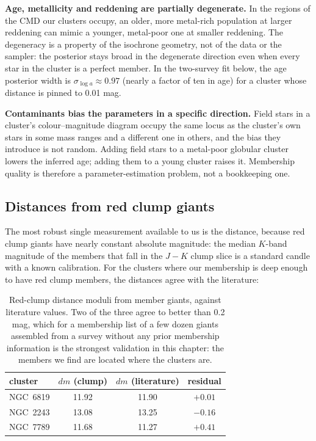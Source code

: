 \textbf{Age, metallicity and reddening are partially degenerate.} In the
regions of the CMD our clusters occupy, an older, more metal-rich population at
larger reddening can mimic a younger, metal-poor one at smaller reddening. The
degeneracy is a property of the isochrone geometry, not of the data or the
sampler: the posterior stays broad in the degenerate direction even when every
star in the cluster is a perfect member. In the two-survey fit below, the age
posterior width is $\sigma_{\log a} \approx 0.97$ (nearly a factor of ten in
age) for a cluster whose distance is pinned to 0.01 mag.

\textbf{Contaminants bias the parameters in a specific direction.} Field stars
in a cluster's colour--magnitude diagram occupy the same locus as the cluster's
own stars in some mass ranges and a different one in others, and the bias they
introduce is not random. Adding field stars to a metal-poor globular cluster
lowers the inferred age; adding them to a young cluster raises it. Membership
quality is therefore a parameter-estimation problem, not a bookkeeping one.

\subsection{Distances from red clump giants}

The most robust single measurement available to us is the distance, because
red clump giants have nearly constant absolute magnitude: the median $K$-band
magnitude of the members that fall in the $J-K$ clump slice is a standard
candle with a known calibration. For the clusters where our membership is
deep enough to have red clump members, the distances agree with the
literature:

\begin{table}[htbp]
\centering
\small
{}
\begin{tabular}{@{}lccc@{}}
\toprule
cluster & $dm$ (clump) & $dm$ (literature) & residual \\
\midrule
NGC~6819 & 11.92 & 11.90 & $+0.01$ \\
NGC~2243 & 13.08 & 13.25 & $-0.16$ \\
NGC~7789 & 11.68 & 11.27 & $+0.41$ \\
\bottomrule
\end{tabular}
\caption{Red-clump distance moduli from member giants, against literature
values. Two of the three agree to better than 0.2 mag, which for a membership
list of a few dozen giants assembled from a survey without any prior
membership information is the strongest validation in this chapter: the
members we find are located where the clusters are.}
\label{tab:dm}
\end{table}

